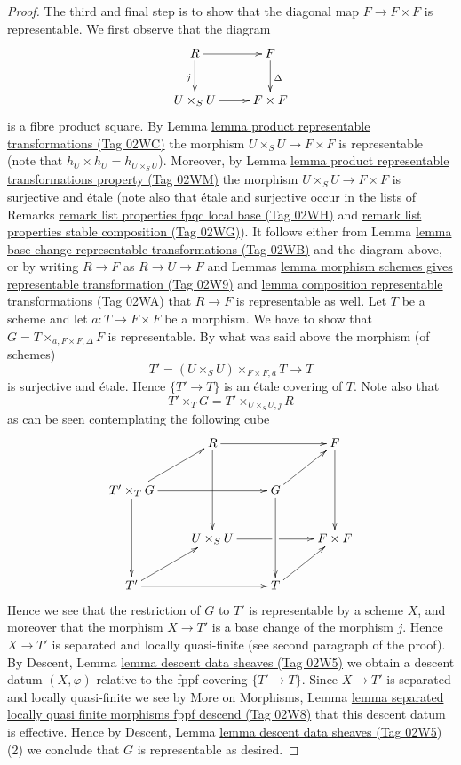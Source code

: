 \documentclass{amsart}
\theoremstyle{plain}
\theoremstyle{definition}
\theoremstyle{remark}
\numberwithin{equation}{subsection}
\begin{document}
\begin{proof}
\medskip\noindent
The third and final step is to show that the diagonal map $F \to F \times F$
is representable. We first observe that the diagram
$$
\xymatrix{
R \ar[r] \ar[d]_j & F \ar[d]^\Delta \\
U \times_S U \ar[r] & F \times F
}
$$
is a fibre product square. By
Lemma \href{https://stacks.math.columbia.edu/tag/02WC}{lemma product representable transformations (Tag 02WC)} the morphism
$U \times_S U \to F \times F$ is representable (note that
$h_U \times h_U = h_{U \times_S U}$). Moreover, by
Lemma \href{https://stacks.math.columbia.edu/tag/02WM}{lemma product representable transformations property (Tag 02WM)}
the morphism $U \times_S U \to F \times F$ is surjective
and \'etale (note also that \'etale and surjective occur in the lists of
Remarks \href{https://stacks.math.columbia.edu/tag/02WH}{remark list properties fpqc local base (Tag 02WH)}
and \href{https://stacks.math.columbia.edu/tag/02WG}{remark list properties stable composition (Tag 02WG)}).
It follows either from
Lemma \href{https://stacks.math.columbia.edu/tag/02WB}{lemma base change representable transformations (Tag 02WB)}
and the diagram above, or by writing $R \to F$ as $R \to U \to F$ and
Lemmas
\href{https://stacks.math.columbia.edu/tag/02W9}{lemma morphism schemes gives representable transformation (Tag 02W9)} and
\href{https://stacks.math.columbia.edu/tag/02WA}{lemma composition representable transformations (Tag 02WA)} that
$R \to F$ is representable as well. Let $T$ be a scheme and let
$a : T \to F \times F$ be a morphism. We have to show that
$G = T \times_{a, F \times F, \Delta} F$ is representable.
By what was said above the morphism (of schemes)
$$
T' = (U \times_S U) \times_{F \times F, a} T \longrightarrow T
$$
is surjective and \'etale. Hence $\{T' \to T\}$ is an \'etale
covering of $T$. Note also that
$$
T' \times_T G = T' \times_{U \times_S U, j} R
$$
as can be seen contemplating the following cube
$$
\xymatrix{
& R \ar[rr] \ar[dd] & & F \ar[dd] \\
T' \times_T G \ar[rr] \ar[dd] \ar[ru] & & G \ar[dd] \ar[ru] & \\
& U \times_S U \ar'[r][rr] & & F \times F \\
T' \ar[rr] \ar[ru] & & T \ar[ru]
}
$$
Hence we see that the restriction of $G$ to $T'$ is representable
by a scheme $X$, and moreover that the morphism $X \to T'$ is
a base change of the morphism $j$. Hence $X \to T'$ is
separated and locally quasi-finite (see second paragraph of the proof).
By Descent, Lemma \href{https://stacks.math.columbia.edu/tag/02W5}{lemma descent data sheaves (Tag 02W5)}
we obtain a descent datum $(X, \varphi)$ relative
to the fppf-covering $\{T' \to T\}$. Since
$X \to T'$ is separated and locally quasi-finite we see by
More on Morphisms, Lemma
\href{https://stacks.math.columbia.edu/tag/02W8}{lemma separated locally quasi finite morphisms fppf descend (Tag 02W8)}
that this descent datum is effective.
Hence by
Descent, Lemma \href{https://stacks.math.columbia.edu/tag/02W5}{lemma descent data sheaves (Tag 02W5)} (2)
we conclude that $G$ is representable as desired.
\end{proof}
\end{document}
